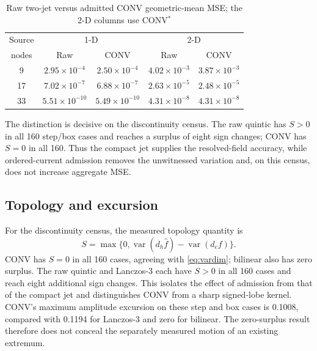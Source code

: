 \documentclass[journal]{IEEEtran}
\newcommand{\var}{\operatorname{var}}
\begin{document}
\begin{table}[H]
\caption{Raw two-jet versus admitted CONV geometric-mean MSE; the 2-D columns use CONV$^{*}$}
\label{tab:projectionablation}
\centering
\scriptsize
\setlength{\tabcolsep}{4.0pt}
\begin{tabular}{c|cc|cc}
\hline
Source & \multicolumn{2}{c|}{1-D} & \multicolumn{2}{c}{2-D} \\
nodes & Raw & CONV & Raw & CONV \\
\hline
9  & $2.95\!\times\!10^{-4}$ & $2.50\!\times\!10^{-4}$ &
     $4.02\!\times\!10^{-3}$ & $3.87\!\times\!10^{-3}$ \\
17 & $7.02\!\times\!10^{-7}$ & $6.88\!\times\!10^{-7}$ &
     $2.63\!\times\!10^{-5}$ & $2.48\!\times\!10^{-5}$ \\
33 & $5.51\!\times\!10^{-10}$ & $5.49\!\times\!10^{-10}$ &
     $4.31\!\times\!10^{-8}$ & $4.31\!\times\!10^{-8}$ \\
\hline
\end{tabular}
\end{table}

The distinction is decisive on the discontinuity census. The raw quintic
has \(S>0\) in all 160 step/box cases and reaches a surplus of eight sign
changes; CONV has \(S=0\) in all 160. Thus the compact jet supplies the
resolved-field accuracy, while ordered-current admission removes the
unwitnessed variation and, on this census, does not increase aggregate MSE.

\subsection{Topology and excursion}

For the discontinuity census, the measured topology quantity is
\begin{equation}
 S=\max\{0,\var(d_h\widehat f)-\var(d_cf)\}.
 \label{eq:measuredsurplus}
\end{equation}
CONV has $S=0$ in all 160 cases, agreeing with
\eqref{eq:vardim}; bilinear also has zero surplus. The raw quintic and
Lanczos-3 each have $S>0$ in all 160 cases and reach eight additional sign
changes. This isolates the effect of admission from that of the compact jet
and distinguishes CONV from a sharp signed-lobe kernel.
CONV's maximum amplitude excursion on these step and box cases is 0.1008,
compared with 0.1194 for Lanczos-3 and zero for bilinear. The zero-surplus
result therefore does not conceal the separately measured motion of an
existing extremum.
\end{document}
